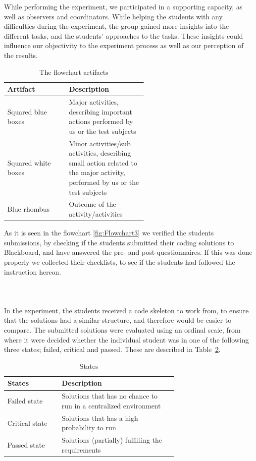 \documentclass{sig-alternate-05-2015}
\begin{document}
While performing the experiment, we participated in a supporting capacity, as well as observers and coordinators. While helping the students with any difficulties during the experiment, the group gained more insights into the different tasks, and the students' approaches to the tasks. These insights could influence our objectivity to the experiment process as well as our perception of the results.\\
\begin{table}[!ht]
\centering
\caption{The flowchart artifacts}
\label{tab:The flowchart artifacts:}
\begin{tabular}{|l|p{0.56\linewidth}|}
\hline
\textbf{Artifact} & \textbf{Description} \\
\hline
\hline
Squared blue boxes & Major activities, describing important actions performed by us or the test subjects\\
Squared white boxes & Minor activities/sub activities, describing small action related to the major activity, performed by us or the test subjects\\
Blue rhombus & Outcome of the activity/activities\\
\hline
\end{tabular}
\end{table}

As it is seen in the flowchart \ref{fig:Flowchart3} we verified the students submissions, by checking if the students submitted their coding solutions to Blackboard, and have answered the pre- and post-questionnaires. If this was done properly we collected their checklists, to see if the students had followed the instruction hereon.\\\\\\\\

In the experiment, the students received a code skeleton to work from, to ensure that the solutions had a similar structure, and therefore would be easier to compare. The submitted solutions were evaluated using an ordinal scale, from where it were decided whether the individual student was in one of the following three states; failed, critical and passed. These are described in Table~\ref{StatesTable}.

\begin{table}[!ht]
\centering
\caption{States}
\label{StatesTable}
\begin{tabular}{|l|p{0.68\linewidth}|}
\hline
\textbf{States} & \textbf{Description} \\
\hline
\hline
Failed state & Solutions that has no chance to run in a centralized environment \\
Critical state & Solutions that has a high probability to run \\
Passed state & Solutions (partially) fulfilling the requirements \\
\hline
\end{tabular}
\end{table}
\end{document}

